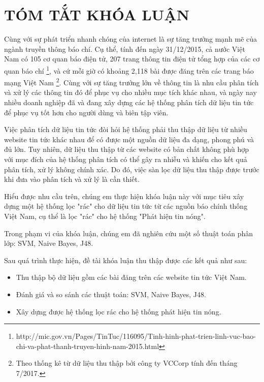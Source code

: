 \pagestyle{fancy}
    \lhead{}    \chead{}         	\rhead{}
    \lfoot{}    \cfoot{\thepage}	\rfoot{}
    \renewcommand{\headrulewidth}{0.4pt}
    \renewcommand{\footrulewidth}{0.4pt}

\chapter*{\centering TÓM TẮT KHÓA LUẬN}
 
\ifpdf
    \graphicspath{{Abstract/AbstractFigs/PNG/}{Abstract/AbstractFigs/PDF/}{Abstract/AbstractFigs/}}
\else
    \graphicspath{{Abstract/AbstractFigs/EPS/}{Abstract/AbstractFigs/}}
\fi

Cùng với sự phát triển nhanh chóng của internet là sự tăng trưởng mạnh mẽ của ngành truyền thông báo chí. Cụ thể, tính đến ngày 31/12/2015, cả nước Việt Nam có 105 cơ quan báo điện tử, 207 trang thông tin điện tử tổng hợp của các cơ quan báo chí \footnote{http://mic.gov.vn/Pages/TinTuc/116095/Tinh-hinh-phat-trien-linh-vuc-bao-chi-va-phat-thanh-truyen-hinh-nam-2015.html}, và cứ mỗi giờ có khoảng 2,118 bài được đăng trên các trang báo mạng Việt Nam \footnote{Theo thống kê từ dữ liệu thu thập bởi công ty VCCorp tính đến tháng 7/2017.}. Cùng với sự tăng trưởng lớn về thông tin là nhu cầu phân tích và xử lý các thông tin đó để phục vụ cho nhiều mục tích khác nhau, và ngày nay nhiều doanh nghiệp đã và đang xây dựng các hệ thống phân tích dữ liệu tin tức để phục vụ tốt hơn cho người dùng và biên tập viên. 

Việc phân tích dữ liệu tin tức đòi hỏi hệ thống phải thu thập dữ liệu từ nhiều website tin tức khác nhau để có được một nguồn dữ liệu đa dạng, phong phú và đủ lớn. Tuy nhiên, dữ liệu thu thập từ các website có bản chất không phù hợp với mục đích của hệ thống phân tích có thể gây ra nhiễu và khiến cho kết quả phân tích, xử lý không chính xác. Do đó, việc sàn lọc dữ liệu thu thập được trước khi đưa vào phân tích và xử lý là cần thiết. 

Hiểu được nhu cầu trên, chúng em thực hiện khóa luận này với mục tiêu xây dựng một hệ thống lọc "rác" cho dữ liệu tin tức từ các nguồn báo chính thống Việt Nam, cụ thể là lọc "rác" cho hệ thống "Phát hiện tin nóng". 

Trong phạm vi của khóa luận, chúng em đã nghiên cứu một số thuật toán phân lớp: SVM, Naive Bayes, J48.

Sau quá trình thực hiện, đề tài khóa luận thu thập được các kết quả như sau:
	\begin{itemize}
		\item Thu thập bộ dữ liệu gồm các bài đăng trên các website tin tức Việt Nam.
		\item Đánh giá và so sánh các thuật toán: SVM, Naive Bayes, J48.
		\item Xây dựng được hệ thống lọc rác cho hệ thống phát hiện tin nóng.
	\end{itemize}


